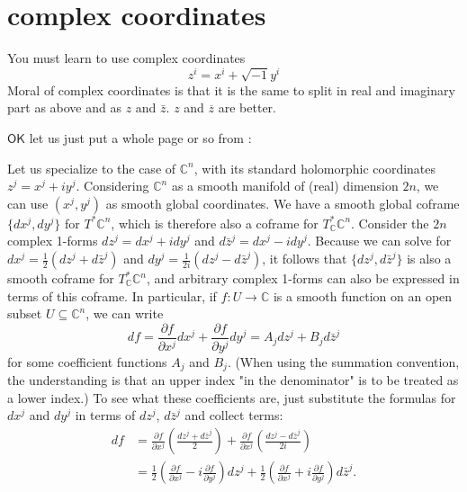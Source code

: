 \section{complex coordinates}

You must learn to use complex coordinates
\[z^i=x^i+\sqrt{-1}y^i \]
Moral of complex coordinates is that it is the same to split in real and imaginary part as above and as \(z\) and \(\bar{z} \). \(z\) and \(\overline{z}\) are better.

\(\mathsf{OK}\) let us just put a whole page or so from \cite{lec}:

Let us specialize to the case of $\mathbb{C}^n$, with its standard holomorphic coordinates $z^j = x^j + i y^j$. Considering $\mathbb{C}^n$ as a smooth manifold of (real) dimension $2n$, we can use $(x^j,y^j)$ as smooth global coordinates. We have a smooth global coframe $\{dx^j, dy^j\}$ for $T^*\mathbb{C}^n$, which is therefore also a coframe for $T^*_\mathbb{C}\mathbb{C}^n$. Consider the $2n$ complex 1-forms $dz^j = dx^j + i dy^j$ and $d\bar{z}^j = dx^j - i dy^j$. Because we can solve for $dx^j = \frac{1}{2}(dz^j+d\bar{z}^j)$ and $dy^j = \frac{1}{2i}(dz^j - d\bar{z}^j)$, it follows that $\{dz^j, d\bar{z}^j\}$ is also a smooth coframe for $T^*_\mathbb{C}\mathbb{C}^n$, and arbitrary complex 1-forms can also be expressed in terms of this coframe. In particular, if $f : U \to \mathbb{C}$ is a smooth function on an open subset $U \subseteq \mathbb{C}^n$, we can write
\[
  df = \frac{\partial f}{\partial x^j} dx^j + \frac{\partial f}{\partial y^j} dy^j = A_j dz^j + B_j d\bar{z}^j
\]
for some coefficient functions $A_j$ and $B_j$. (When using the summation convention, the understanding is that an upper index "in the denominator" is to be treated as a lower index.) To see what these coefficients are, just substitute the formulas for $dx^j$ and $dy^j$ in terms of $dz^j$, $d\bar{z}^j$ and collect terms:
\begin{equation}\label{eq:local}\begin{aligned}
  df &= \frac{\partial f}{\partial x^j}\left(\frac{dz^j + d\bar{z}^j}{2}\right) + \frac{\partial f}{\partial x^j}\left(\frac{dz^j - d\bar{z}^j}{2i}\right) \nonumber\\[8pt]
  &= \frac{1}{2}\left(\frac{\partial f}{\partial x^j} - i\frac{\partial f}{\partial y^j}\right)dz^j + \frac{1}{2}\left(\frac{\partial f}{\partial x^j} + i\frac{\partial f}{\partial y^j}\right)d\bar{z}^j.
\end{aligned}\end{equation}

